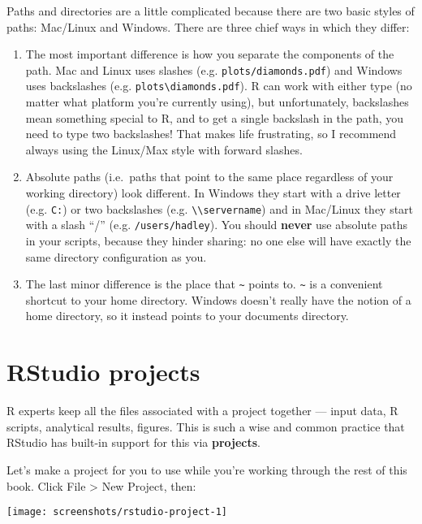 \documentclass[]{book}
\begin{document}
Paths and directories are a little complicated because there are two
basic styles of paths: Mac/Linux and Windows. There are three chief ways
in which they differ:

\begin{enumerate}
\def\labelenumi{\arabic{enumi}.}
\item
  The most important difference is how you separate the components of
  the path. Mac and Linux uses slashes (e.g.
  \texttt{plots/diamonds.pdf}) and Windows uses backslashes (e.g.
  \texttt{plots\textbackslash{}diamonds.pdf}). R can work with either
  type (no matter what platform you're currently using), but
  unfortunately, backslashes mean something special to R, and to get a
  single backslash in the path, you need to type two backslashes! That
  makes life frustrating, so I recommend always using the Linux/Max
  style with forward slashes.
\item
  Absolute paths (i.e.~paths that point to the same place regardless of
  your working directory) look different. In Windows they start with a
  drive letter (e.g. \texttt{C:}) or two backslashes (e.g.
  \texttt{\textbackslash{}\textbackslash{}servername}) and in Mac/Linux
  they start with a slash ``/'' (e.g. \texttt{/users/hadley}). You
  should \textbf{never} use absolute paths in your scripts, because they
  hinder sharing: no one else will have exactly the same directory
  configuration as you.
\item
  The last minor difference is the place that \texttt{\textasciitilde{}}
  points to. \texttt{\textasciitilde{}} is a convenient shortcut to your
  home directory. Windows doesn't really have the notion of a home
  directory, so it instead points to your documents directory.
\end{enumerate}

\section{RStudio projects}\label{rstudio-projects}

R experts keep all the files associated with a project together ---
input data, R scripts, analytical results, figures. This is such a wise
and common practice that RStudio has built-in support for this via
\textbf{projects}.

Let's make a project for you to use while you're working through the
rest of this book. Click File \textgreater{} New Project, then:

\begin{center}\texttt{[image: screenshots/rstudio-project-1]} \end{center}
\end{document}
